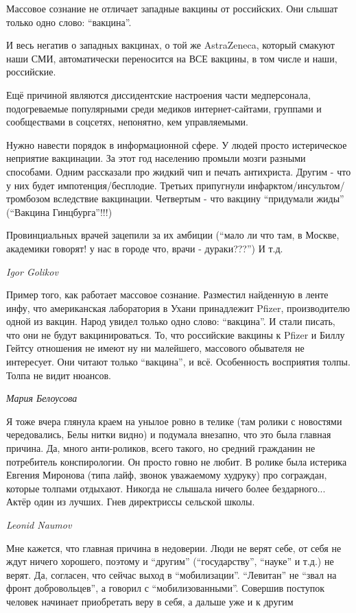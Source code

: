 Массовое сознание не отличает западные вакцины от российских. Они слышат только одно слово: \enquote{вакцина}.

И весь негатив о западных вакцинах, о той же AstraZeneca, который смакуют наши
СМИ, автоматически переносится на ВСЕ вакцины, в том числе и наши, российские.

Ещё причиной являются диссидентские настроения части медперсонала,
подогреваемые популярными среди медиков интернет-сайтами, группами и
сообществами в соцсетях, непонятно, кем управляемыми.

Нужно навести порядок в информационной сфере.
У людей просто истерическое неприятие вакцинации.
За этот год населению промыли мозги разными способами.
Одним рассказали про жидкий чип и печать антихриста.
Другим - что у них будет импотенция/бесплодие.
Третьих припугнули инфарктом/инсультом/тромбозом вследствие вакцинации.
Четвертым - что вакцину \enquote{придумали жиды} (\enquote{Вакцина Гинцбурга}!!!)

Провинциальных врачей зацепили за их амбиции (\enquote{мало ли что там, в
Москве, академики говорят! у нас в городе что, врачи - дураки???}) И т.д.

\emph{Igor Golikov}

Пример того, как работает массовое сознание. Разместил найденную в ленте инфу,
что американская лаборатория в Ухани принадлежит Pfizer, производителю одной из
вакцин.  Народ увидел только одно слово: \enquote{вакцина}.  И стали писать,
что они не будут вакцинироваться.  То, что российские вакцины к Pfizer и Биллу
Гейтсу отношения не имеют ну ни малейшего, массового обывателя не интересует.
Они читают только \enquote{вакцина}, и всё.  Особенность восприятия толпы.
Толпа не видит нюансов.

\emph{Мария Белоусова}

Я тоже вчера глянула краем на унылое ровно в телике (там ролики с новостями
чередовались, Белы нитки видно) и подумала внезапно, что это была главная
причина. Да, много анти-роликов, всего такого, но средний гражданин не
потребитель конспирологии. Он просто говно не любит. В ролике была истерика
Евгения Миронова (типа лайф, звонок уважаемому худруку) про сограждан, которые
толпами отдыхают. Никогда не слышала ничего более бездарного... Актёр один из
лучших. Гнев директриссы сельской школы.

\emph{Leonid Naumov}

Мне кажется, что главная причина в недоверии. Люди не верят себе, от себя не
ждут ничего хорошего, поэтому и \enquote{другим} (\enquote{государству},
\enquote{науке} и т.д.) не верят. Да, согласен, что сейчас выход в
\enquote{мобилизации}. \enquote{Левитан} не \enquote{звал на фронт
добровольцев}, а говорил с \enquote{мобилизованными}. Совершив поступок человек
начинает приобретать веру в себя, а дальше уже и к другим


